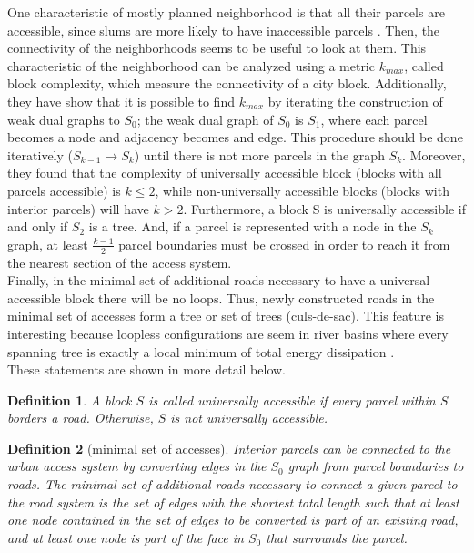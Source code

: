 \documentclass[10pt]{article}
\newtheorem{definition}{Definition}
\begin{document}
One characteristic of mostly planned neighborhood is that all their parcels are accessible, since slums are more likely to have inaccessible parcels \cite{unh}. Then, the connectivity of the neighborhoods seems to be useful to look at them. This characteristic of the neighborhood can be analyzed using a metric $k_{max}$, called block complexity, which measure the connectivity of a city block. Additionally, they have show that it is possible to find $k_{max}$ by iterating the construction of weak dual graphs to $S_0$; the weak dual graph of $S_0$ is $S_1$, where each parcel becomes a node and adjacency becomes and edge. This procedure should be done iteratively ($S_{k-1}\longrightarrow S_k$) until there is not more parcels in the graph $S_k$. Moreover, they found that the complexity of universally accessible block (blocks with all parcels accessible) is $k \leq 2$, while non-universally accessible blocks (blocks with interior parcels) will have $k>2$. Furthermore, a block S is universally accessible if and only if $S_2$ is a tree. And, if a parcel is represented with a node in the $S_k$ graph, at least $\frac{k-1}{2}$ parcel boundaries must be crossed in order to reach it from the nearest section of the access system.\\

Finally, in the minimal set of additional roads necessary to have a universal accessible block there will be no loops. Thus, newly constructed roads in the minimal set of accesses form a tree or set of trees (culs-de-sac). This feature is interesting because loopless configurations are seem in river basins where every spanning tree is exactly a local minimum of total energy dissipation \cite{and}.\\

These statements are shown in more detail below.

\begin{definition}
A block $S$ is called universally accessible if every parcel within $S$ borders a road.  Otherwise, $S$ is not universally accessible.
\end{definition}

\begin{definition}[minimal set of accesses]
Interior parcels can be connected to the urban access system by converting edges in the $S_0$ graph from parcel boundaries to roads.  The minimal set of additional roads necessary to connect a given parcel to the road system is the set of edges with the shortest total length such that at least one node contained in the set of edges to be converted is part of an existing road, and at least one node is part of the face in $S_0$ that surrounds the parcel.
\end{definition}
\end{document}
